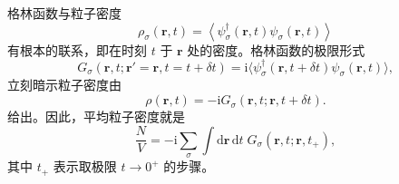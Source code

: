 格林函数与粒子密度
\begin{equation*}
\rho_{\sigma}(\mathbf{r},t)=\left\langle\psi_{\sigma}^{\dagger}(\mathbf{r},t)\psi_{\sigma}(\mathbf{r},t)\right\rangle\tag{7.47}
\end{equation*}
有根本的联系，即在时刻 $t$ 于 $\mathbf{r}$ 处的密度。格林函数的极限形式
\begin{equation*}
G_{\sigma}(\mathbf{r},t;\mathbf{r}'=\mathbf{r},t=t+\delta t)=\mathrm{i}\big\langle\psi_{\sigma}^{\dagger}(\mathbf{r},t+\delta t)\psi_{\sigma}(\mathbf{r},t)\big\rangle,\tag{7.48}
\end{equation*}
立刻暗示粒子密度由
\begin{equation*}
\rho(\mathbf{r},t)=-\mathrm{i}G_{\sigma}(\mathbf{r},t;\mathbf{r},t+\delta t).\tag{7.49}
\end{equation*}
给出。因此，平均粒子密度就是
\begin{equation*}
\frac{N}{V}=-\mathrm{i}\sum_{\sigma}\int\mathrm{d}\mathbf{r}\,\mathrm{d}t\;G_{\sigma}(\mathbf{r},t;\mathbf{r},t_{+}),\tag{7.50}
\end{equation*}
其中 $t_{+}$ 表示取极限 $t\to 0^{+}$ 的步骤。

